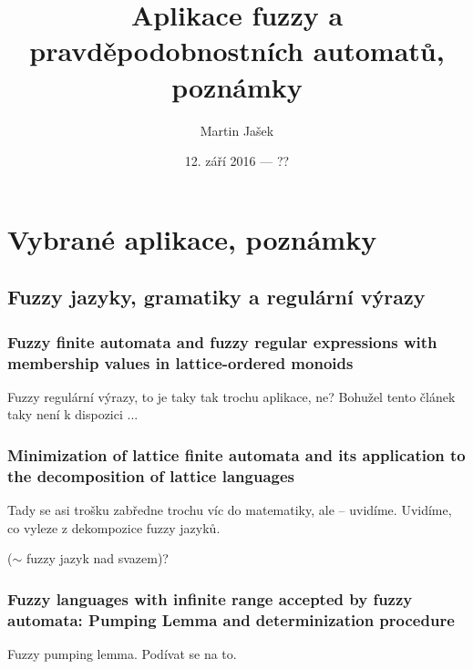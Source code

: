 \documentclass[a4paper,10pt]{article}
\title{Aplikace fuzzy a pravděpodobnostních automatů, poznámky}
\author{Martin Jašek}
\date{12. září 2016 --- ??}
\begin{document}
\maketitle
\tableofcontents

\newpage

\section{Vybrané aplikace, poznámky}

\subsection{Fuzzy jazyky, gramatiky a regulární výrazy}


\subsubsection*{Fuzzy finite automata and fuzzy regular expressions with membership values in lattice-ordered monoids \cite{LiPed-FuzzFinAutFuzzRegExMembValLattOrdMon}}

Fuzzy regulární výrazy, to je taky tak trochu aplikace, ne? Bohužel tento článek taky není k dispozici ...


\subsubsection*{Minimization of lattice finite automata and its application to the decomposition of lattice languages \cite{LiPed-MinLattFinAutAppDecoLattLang}}

Tady se asi trošku zabředne trochu víc do matematiky, ale -- uvidíme. Uvidíme, co vyleze z dekompozice fuzzy jazyků.

\begin{definition}
  ($\sim$ fuzzy jazyk nad svazem)?
\end{definition}

\subsubsection*{Fuzzy languages with infinite range accepted by fuzzy automata: Pumping Lemma and determinization procedure \cite{GonGar-FuzzLangInfRanAccGuzzAutPumLemDetProc}}

Fuzzy pumping lemma. Podívat se na to.
\end{document}
